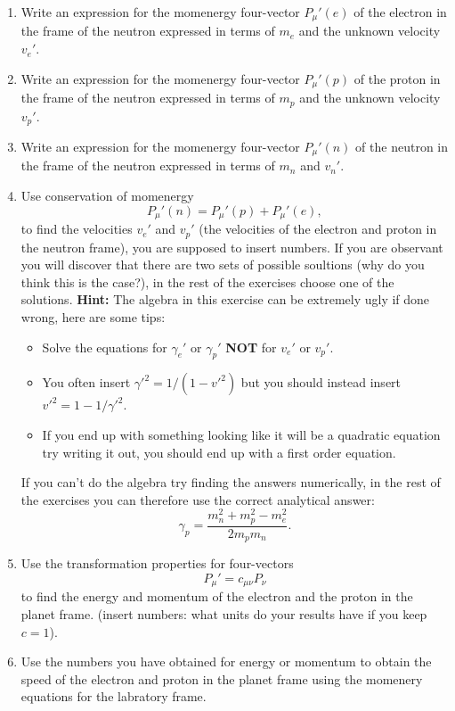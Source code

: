 {\begin{multicols}{2}
\begin{enumerate}
\item Write an expression for the momenergy four-vector $P_\mu'(e)$ of the electron in the frame of the neutron expressed in terms of $m_e$ and the unknown velocity $v_e'$.
\item Write an expression for the momenergy four-vector $P_\mu'(p)$ of the proton in the frame of the neutron expressed in terms of $m_p$ and the unknown velocity $v_p'$.
\item Write an expression for the momenergy four-vector $P_\mu'(n)$ of the neutron in the frame of the neutron expressed in terms of $m_n$ and $v_n'$.
\item Use conservation of momenergy
\[
P_\mu'(n)=P_\mu'(p)+P_\mu'(e),
\]
to find the velocities $v_e'$ and $v_p'$ (the velocities of the electron and proton in the neutron frame), you are supposed to insert numbers. If you are observant you will discover that there are two sets of possible soultions (why do you think this is the case?), in the rest of the exercises choose one of the solutions. {\bf Hint:} The algebra in this exercise can be extremely ugly if done wrong, here are some tips:
\begin{itemize}
\item Solve the equations for $\gamma_e'$ or $\gamma_p'$ \textbf{NOT} for $v_e'$ or $v_p'$.
\item You often insert ${\gamma'}^2=1/\left({1-{v'}^2}\right)$ but you should instead insert ${v'}^2=1-1/{\gamma'}^2$.
\item If you end up with something looking like it will be a quadratic equation try writing it out, you should end up with a first order equation.
\end{itemize}
If you can't do the algebra try finding the answers numerically, in the rest of the exercises you can therefore use the correct analytical answer:
\begin{equation}
\gamma_p=\dfrac{m_n^2+m_p^2-m_e^2}{2m_pm_n}.
\end{equation}
\item Use the transformation properties for four-vectors
\[
P_\mu'=c_{\mu\nu}P_\nu
\]
to find the energy and momentum of the electron and the proton in the planet frame. (insert numbers: what units do your results have if you keep $c=1$).
\item Use the numbers you have obtained for energy or momentum to obtain the speed of the electron and proton in the planet frame using the momenery equations for the labratory frame.

\end{enumerate}
\end{multicols}}
